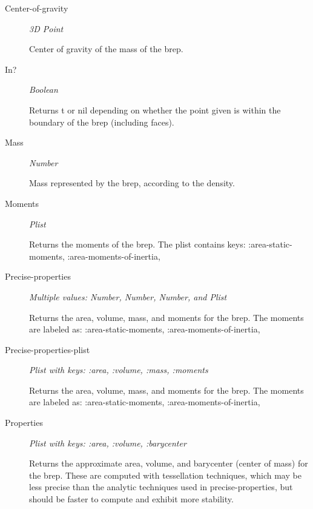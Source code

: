 \documentclass [11pt]{book}
\begin{document}
\begin{itemize}
\begin{description}
\item [Center-of-gravity]
\emph{3D Point}

 Center of gravity of the mass of the brep.




\item [In?]
\emph{Boolean}

 Returns t or nil depending on whether the point given is within the boundary of the brep (including faces).




\item [Mass]
\emph{Number}

 Mass represented by the brep, according to the density.




\item [Moments]
\emph{Plist}

 Returns the moments of the brep. The plist contains keys: :area-static-moments, :area-moments-of-inertia,




\item [Precise-properties]
\emph{Multiple values: Number, Number, Number, and Plist}

 Returns the area, volume, mass,
and moments for the brep. The moments are labeled as: :area-static-moments, :area-moments-of-inertia,




\item [Precise-properties-plist]
\emph{Plist with keys: :area, :volume, :mass, :moments}

 Returns the area, volume, mass,
and moments for the brep. The moments are labeled as: :area-static-moments, :area-moments-of-inertia,




\item [Properties]
\emph{Plist with keys: :area, :volume, :barycenter}

 Returns the approximate area, volume,
and barycenter (center of mass) for the brep. These are computed with tessellation techniques,
which may be less precise than the analytic techniques used in precise-properties, but should
be faster to compute and exhibit more stability.






\end{description}
\end{itemize}
\end{document}
